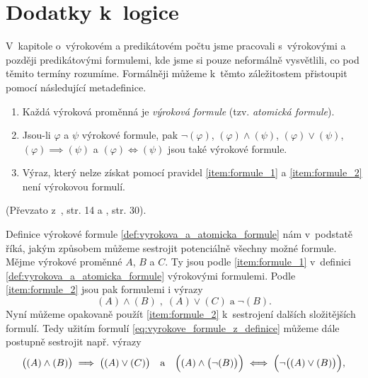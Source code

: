\chapter{Dodatky k~logice}\label{chap:dodatky_k_logice}
V~kapitole o~výrokovém a predikátovém počtu jsme pracovali s~výrokovými a později predikátovými formulemi, kde jsme si pouze neformálně vysvětlili, co pod těmito termíny rozumíme. Formálněji můžeme k~těmto záležitostem přistoupit pomocí následující metadefinice.
\begin{definition}\label{def:vyrokova_a_atomicka_formule}
    
    \begin{enumerate}[label=(\roman*)]
        \item\label{item:formule_1} Každá výroková proměnná je \emph{výroková formule} (tzv. \emph{atomická formule}).
        \item\label{item:formule_2} Jsou-li $\varphi$ a $\psi$ výrokové formule, pak $\neg (\varphi)$, $(\varphi) \land (\psi)$, $(\varphi) \lor (\psi)$, $(\varphi) \implies (\psi)$ a $(\varphi) \iff (\psi)$ jsou také výrokové formule.
        \item\label{item:formule_3} Výraz, který nelze získat pomocí pravidel \ref{item:formule_1} a \ref{item:formule_2} není výrokovou formulí.
    \end{enumerate}
\end{definition}
(Převzato z~\cite{Fuchs2003}, str. 14 a \cite{BalcarStepanek1986}, str. 30).\par
Definice výrokové formule \ref{def:vyrokova_a_atomicka_formule} nám v~podstatě říká, jakým způsobem můžeme sestrojit potenciálně všechny možné formule. Mějme výrokové proměnné $A$, $B$ a $C$. Ty jsou podle \ref{item:formule_1} v~definici \ref{def:vyrokova_a_atomicka_formule} výrokovými formulemi. Podle \ref{item:formule_2} jsou pak formulemi i výrazy
\begin{equation}\label{eq:vyrokove_formule_z_definice}
    (A) \land (B)\;,\;(A) \lor (C)\;\text{a}\;\neg(B).
\end{equation}
Nyní můžeme opakovaně použít \ref{item:formule_2} k~sestrojení dalších složitějších formulí. Tedy užitím formulí \eqref{eq:vyrokove_formule_z_definice} můžeme dále postupně sestrojit např. výrazy
\begin{equation*}
    \bigl((A) \land (B)\bigr) \implies \bigl((A) \lor (C)\bigr)\quad\text{a}\quad\Bigl((A) \land \bigl(\neg(B)\bigr)\Bigr) \iff \Bigl(\neg\bigl((A) \lor (B)\bigr)\Bigr),
\end{equation*}
